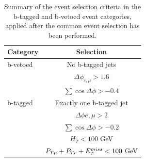 \begin{table}[!t]
  \begin{center}
    \begin{tabular}{p{4cm}c}
      \hline \hline
      Category & Selection \\ [3pt]
      \hline
      b-vetoed &  No b-tagged jets \\	
      & $\Delta\phi_{e,\mu}>1.6$ \\
      & $\sum\cos\Delta\phi > -0.4$ \\[5pt]
      \hline
      b-tagged & Exactly one b-tagged  jet \\
      & $\Delta\phi{e,\mu}>2$ \\
      & $\sum\cos\Delta\phi > -0.2$ \\
      & $ H_T < 100$ GeV \\
      & $P_{T\mu} + P_{Te} + E_{T}^{miss} < 100$ GeV \\[3pt]
      \hline \hline
    \end{tabular}
    \caption{Summary of the event selection criteria in the b-tagged and b-vetoed event categories, applied after the common 
	event selection has been performed.}
    \label{tab:sel}
  \end{center}
\end{table}

